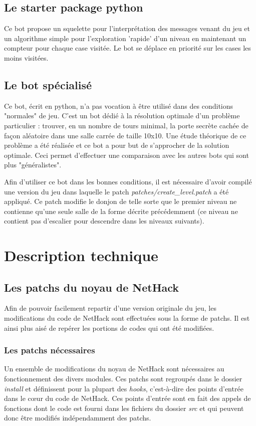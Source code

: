 \documentclass[10pt,a4paper]{report}
\begin{document}
\section{Le starter package python}

Ce bot propose un squelette pour l'interprétation des messages venant du jeu et un algorithme simple pour l'exploration 'rapide' d'un niveau en maintenant un compteur pour chaque case visitée. Le bot se déplace en priorité sur les cases les moins visitées.

\section{Le bot spécialisé}
Ce bot, écrit en python, n'a pas vocation à être utilisé dans des conditions
"normales" de jeu. C'est un bot dédié à la résolution optimale d'un problème
particulier : trouver, en un nombre de tours minimal, la porte secrète cachée
de façon aléatoire dans une salle carrée de taille 10x10. Une étude théorique
de ce problème a été réalisée et ce bot a pour but de s'approcher de la
solution optimale. Ceci permet d'effectuer une comparaison avec les autres
bots qui sont plus "généralistes".

Afin d'utiliser ce bot dans les bonnes conditions, il est nécessaire d'avoir
compilé une version du jeu dans laquelle le patch
\emph{patches/create\_level.patch} a été appliqué. Ce patch modifie le donjon
de telle sorte que le premier niveau ne contienne qu'une seule salle de la
forme décrite précédemment (ce niveau ne contient pas d'escalier pour
descendre dans les niveaux suivants).

\chapter{Description technique}
\section{Les patchs du noyau de NetHack}
Afin de pouvoir facilement repartir d'une version originale du jeu, les
modifications du code de NetHack sont effectuées sous la forme de patchs. Il
est ainsi plus aisé de repérer les portions de codes qui ont été modifiées.

\subsection{Les patchs nécessaires}
Un ensemble de modifications du noyau de NetHack sont nécessaires au
fonctionnement des divers modules. Ces patchs sont regroupés dans le dossier
\emph{install} et définissent pour la plupart des \emph{hooks}, c'est-à-dire des
points d'entrée dans le cœur du code de NetHack. Ces points d'entrée sont en
fait des appels de fonctions dont le code est fourni dans les fichiers du
dossier \emph{src} et qui peuvent donc être modifiés indépendamment des patchs.
\end{document}
